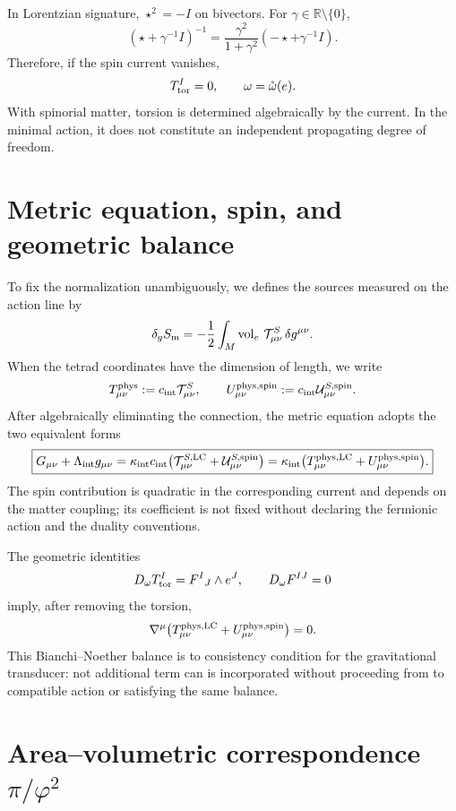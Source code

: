 In Lorentzian signature, \(\star^2=-I\) on bivectors.  For
\(\gamma\in\mathbb R\setminus\{0\}\),
\[
 (\star+\gamma^{-1}I)^{-1}
 =\frac{\gamma^2}{1+\gamma^2}
  (-\star+\gamma^{-1}I).
\]
Therefore, if the spin current vanishes,
\[
 T_{\rm tor}^I=0,\qquad
 \omega=\mathring\omega(e).
\]
With spinorial matter, torsion is determined algebraically by the
current.  In the minimal action, it does not constitute an independent
propagating degree of freedom.

\section{Metric equation, spin, and geometric balance}

To fix the normalization unambiguously, we defines the sources measured on
the action line by
\[
 \delta_g S_{\rm m}
 =-\frac12\int_M\operatorname{vol}_e\,
 \mathcal T^{S}_{\mu\nu}\,\delta g^{\mu\nu}.
\]
When the tetrad coordinates have the dimension of length, we write
\[
 T^{\rm phys}_{\mu\nu}:=c_{\rm int}\mathcal T^{S}_{\mu\nu},
 \qquad
 U^{\rm phys,spin}_{\mu\nu}
 :=c_{\rm int}\mathcal U^{S,\rm spin}_{\mu\nu}.
\]
After algebraically eliminating the connection, the metric equation adopts the two equivalent forms
\[
 \boxed{
 G_{\mu\nu}+\Lambda_{\rm int}g_{\mu\nu}
 =\kappa_{\rm int}c_{\rm int}
 \bigl(\mathcal T_{\mu\nu}^{S,\rm LC}
       +\mathcal U_{\mu\nu}^{S,\rm spin}\bigr)
 =\kappa_{\rm int}
 \bigl(T_{\mu\nu}^{\rm phys,LC}
       +U_{\mu\nu}^{\rm phys,spin}\bigr).}
\]
The spin contribution is quadratic in the corresponding current and
depends on the matter coupling; its coefficient is not fixed without declaring
the fermionic action and the duality conventions.

The geometric identities
\[
 D_\omega T_{\rm tor}^{I}=F^{I}{}_{J}\wedge e^{J},
 \qquad
 D_\omega F^{IJ}=0
\]
imply, after removing the torsion,
\[
 \nabla^\mu\bigl(T_{\mu\nu}^{\rm phys,LC}
             +U_{\mu\nu}^{\rm phys,spin}\bigr)=0.
\]
This Bianchi--Noether balance is to consistency condition for the
gravitational transducer: not additional term can is incorporated without
proceeding from to compatible action or satisfying the same balance.

\section{Area--volumetric correspondence \(\pi/\varphi^2\)}


